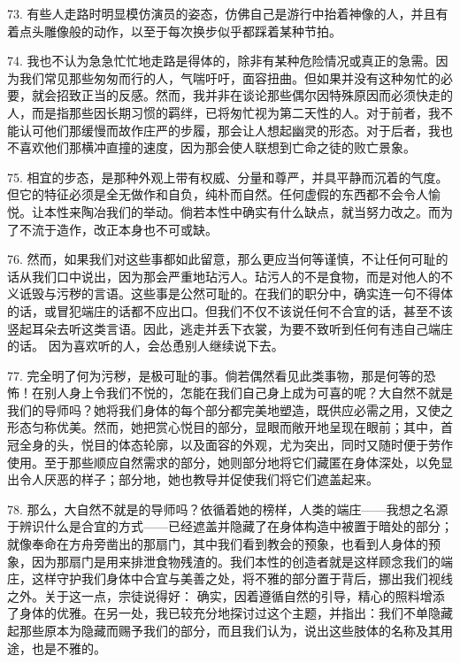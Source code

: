 73. 有些人走路时明显模仿演员的姿态，仿佛自己是游行中抬着神像的人，并且有着点头雕像般的动作，以至于每次换步似乎都踩着某种节拍。\par

74. 我也不认为急急忙忙地走路是得体的，除非有某种危险情况或真正的急需。因为我们常见那些匆匆而行的人，气喘吁吁，面容扭曲。但如果并没有这种匆忙的必要，就会招致正当的反感。然而，我并非在谈论那些偶尔因特殊原因而必须快走的人，而是指那些因长期习惯的羁绊，已将匆忙视为第二天性的人。对于前者，我不能认可他们那缓慢而故作庄严的步履，那会让人想起幽灵的形态。对于后者，我也不喜欢他们那横冲直撞的速度，因为那会使人联想到亡命之徒的败亡景象。\par

75. 相宜的步态，是那种外观上带有权威、分量和尊严，并具平静而沉着的气度。但它的特征必须是全无做作和自负，纯朴而自然。任何虚假的东西都不会令人愉悦。让本性来陶冶我们的举动。倘若本性中确实有什么缺点，就当努力改之。而为了不流于造作，改正本身也不可或缺。\par

76. 然而，如果我们对这些事都如此留意，那么更应当何等谨慎，不让任何可耻的话从我们口中说出，因为那会严重地玷污人。玷污人的不是食物，而是对他人的不义诋毁与污秽的言语。这些事是公然可耻的。在我们的职分中，确实连一句不得体的话，或冒犯端庄的话都不应出口。但我们不仅不该说任何不合宜的话，甚至不该竖起耳朵去听这类言语。因此，逃走并丢下衣裳，为要不致听到任何有违自己端庄的话。 因为喜欢听的人，会怂恿别人继续说下去。\par

77. 完全明了何为污秽，是极可耻的事。倘若偶然看见此类事物，那是何等的恐怖！在别人身上令我们不悦的，怎能在我们自己身上成为可喜的呢？大自然不就是我们的导师吗？她将我们身体的每个部分都完美地塑造，既供应必需之用，又使之形态匀称优美。然而，她把赏心悦目的部分，显眼而敞开地呈现在眼前；其中，首冠全身的头，悦目的体态轮廓，以及面容的外观，尤为突出，同时又随时便于劳作使用。至于那些顺应自然需求的部分，她则部分地将它们藏匿在身体深处，以免显出令人厌恶的样子；部分地，她也教导并促使我们将它们遮盖起来。\par

78. 那么，大自然不就是的导师吗？依循着她的榜样，人类的端庄——我想之名源于辨识什么是合宜的方式——已经遮盖并隐藏了在身体构造中被置于暗处的部分；就像奉命在方舟旁凿出的那扇门，其中我们看到教会的预象，也看到人身体的预象，因为那扇门是用来排泄食物残渣的。我们本性的创造者就是这样顾念我们的端庄，这样守护我们身体中合宜与美善之处，将不雅的部分置于背后，挪出我们视线之外。关于这一点，宗徒说得好： 确实，因着遵循自然的引导，精心的照料增添了身体的优雅。在另一处，我已较充分地探讨过这个主题，并指出：我们不单隐藏起那些原本为隐藏而赐予我们的部分，而且我们认为，说出这些肢体的名称及其用途，也是不雅的。\par

